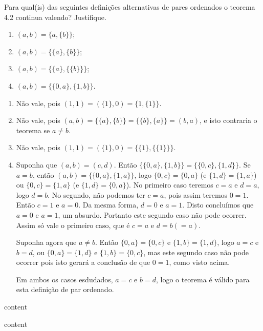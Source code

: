\begin{exercicio}
	Para qual(is) das seguintes definições alternativas de pares ordenados o teorema 4.2 continua valendo? Justifique.
	\begin{enumerate}[label=(\alph{*})]
		\item $(a,b)=\{a,\{b\}\}$;
		\item $(a,b)=\{\{a\},\{b\}\}$;
		\item $(a,b)=\{\{a\},\{\{b\}\}\}$;
		\item $(a,b)=\{\{0,a\},\{1,b\}\}$.
	\end{enumerate}
\end{exercicio}
\begin{solucao}
	\begin{enumerate}[label=(\alph{*})]
		\item Não vale, pois $(1,1)=(\{1\},0)=\{1,\{1\}\}$.
		\item Não vale, pois $(a,b)=\{\{a\},\{b\}\}=\{\{b\},\{a\}\}=(b,a)$, e isto contraria o teorema se $a\neq b$.
		\item Não vale, pois $(1,1)=(\{1\},0)=\{\{1\},\{\{1\}\}\}$.
		\item Suponha que $(a,b)=(c,d)$. Então $\{\{0,a\},\{1,b\}\}=\{\{0,c\},\{1,d\}\}$. Se $a=b$, então $(a,b)=\{\{0,a\},\{1,a\}\}$, logo $\{0,c\}=\{0,a\}$ (e $\{1,d\}=\{1,a\}$) ou $\{0,c\}=\{1,a\}$ (e $\{1,d\}=\{0,a\}$). No primeiro caso teremos $c=a$ e $d=a$, logo $d=b$. No segundo, não podemos ter $c=a$, pois assim teremos $0=1$. Então $c=1$ e $a=0$. Da mesma forma, $d=0$ e $a=1$. Disto concluímos que $a=0$ e $a=1$, um absurdo. Portanto este segundo caso não pode ocorrer. Assim só vale o primeiro caso, que é $c=a$ e $d=b(=a)$.
		
		Suponha agora que $a\neq b$. Então $\{0,a\}=\{0,c\}$ e $\{1,b\}=\{1,d\}$, logo $a=c$ e $b=d$, ou $\{0,a\}=\{1,d\}$ e $\{1,b\}=\{0,c\}$, mas este segundo caso não pode ocorrer pois isto gerará a conclusão de que $0=1$, como visto acima.
		
		Em ambos os casos esdudados, $a=c$ e $b=d$, logo o teorema é válido para esta definição de par ordenado.
	\end{enumerate}
\end{solucao}

\begin{exercicio}
	content
\end{exercicio}
\begin{solucao}
	content
\end{solucao}

